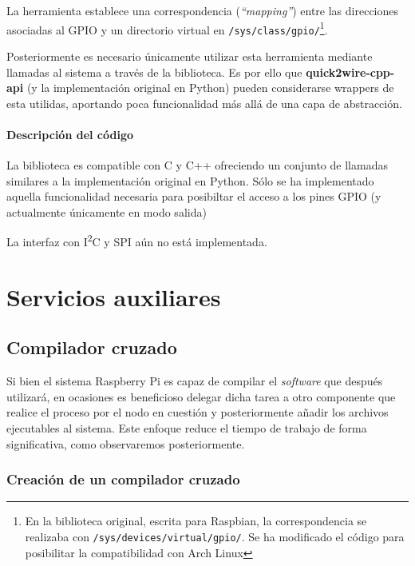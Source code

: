 La herramienta establece una correspondencia (\textit{``mapping''}) entre las direcciones asociadas al GPIO y un directorio virtual en \texttt{/sys/class/gpio/}\footnote{En la biblioteca original, escrita para Raspbian, la correspondencia se realizaba con \texttt{/sys/devices/virtual/gpio/}. Se ha modificado el código para posibilitar la compatibilidad con Arch Linux}.

Posteriormente es necesario únicamente utilizar esta herramienta mediante llamadas al sistema a través de la biblioteca. Es por ello que \textbf{quick2wire-cpp-api} (y la implementación original en Python) pueden considerarse wrappers de esta utilidas, aportando poca funcionalidad más allá de una capa de abstracción.

\paragraph{Descripción del código}

La biblioteca es compatible con C y C++ ofreciendo un conjunto de llamadas similares a la implementación original en Python. Sólo se ha implementado aquella funcionalidad necesaria para posibiltar el acceso a los pines GPIO (y actualmente únicamente en modo salida) %

La interfaz con I\textsuperscript{2}C y SPI aún no está implementada.

\section{Servicios auxiliares}
\label{chapter:serviciosauxiliares}
\subsection{Compilador cruzado}

Si bien el sistema Raspberry Pi es capaz de compilar el \textit{software} que después utilizará, en ocasiones es beneficioso delegar dicha tarea a otro componente que realice el proceso por el nodo en cuestión y posteriormente añadir los archivos ejecutables al sistema. Este enfoque reduce el tiempo de trabajo de forma significativa, como observaremos posteriormente.%

\subsubsection{Creación de un compilador cruzado}

